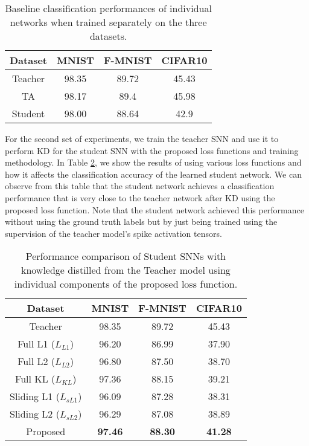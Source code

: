 \documentclass{article}
\begin{document}
\begin{table}[!t]
\caption{Baseline classification performances of individual networks when trained separately on the three datasets.}
    \label{tab:individualPerformance}
    \centering
    \begin{tabular}{c|c c c}
        \hline \textbf{Dataset} & \textbf{MNIST} & \textbf{F-MNIST} & \textbf{CIFAR10}\\ \hline
        Teacher & 98.35 & 89.72 & 45.43 \\
        TA & 98.17 & 89.4 & 45.98 \\
        Student & 98.00 & 88.64 & 42.9 \\
        \hline
    \end{tabular}
\end{table}

For the second set of experiments, we train the teacher SNN and use it to perform KD for the student SNN with the proposed loss functions and training methodology. In Table \ref{tab:lossAbalation}, we show the results of using various loss functions and how it affects the classification accuracy of the learned student network. We can observe from this table that the student network achieves a classification performance that is very close to the teacher network after KD using the proposed loss function. Note that the student network achieved this performance without using the ground truth labels but by just being trained using the supervision of the teacher model's spike activation tensors.

\begin{table}[!t]
\caption{Performance comparison of Student SNNs with knowledge distilled from the Teacher model using individual components of the proposed loss function.}
\label{tab:lossAbalation}
\centering
	\begin{tabular}{c|c c c}
        \hline \textbf{Dataset} & \textbf{MNIST} & \textbf{F-MNIST} & \textbf{CIFAR10} \\ \hline
        Teacher & 98.35 & 89.72 & 45.43 \\ \hline
        Full L1 ($L_{L1}$) & 96.20 & 86.99 & 37.90 \\
        Full L2 ($L_{L2}$) & 96.80 & 87.50 & 38.70 \\
	    Full KL ($L_{KL}$) & 97.36 & 88.15 & 39.21 \\
        Sliding L1 ($L_{sL1}$) & 96.09 & 87.28 & 38.31 \\
        Sliding L2 ($L_{sL2}$) & 96.29 & 87.08 & 38.89 \\
        Proposed & \textbf{97.46} & \textbf{88.30} & \textbf{41.28} \\
	\hline
\end{tabular}
\end{table}
\end{document}
